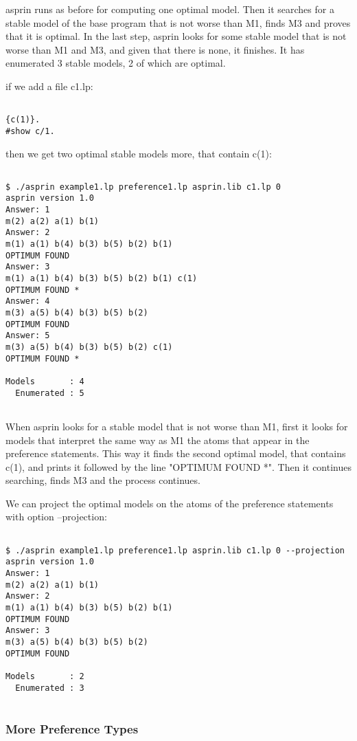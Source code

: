 asprin runs as before for computing one optimal model. Then it searches for a stable model of the base program that is not worse than M1, finds M3 and proves that it is optimal. In the last step, asprin looks for some stable model that is not worse than M1 and M3,  and given that there is none, it finishes. It has enumerated 3 stable models, 2 of which are optimal. 

 if we add a file c1.lp: 
\begin{verbatim}

{c(1)}.
#show c/1.
\end{verbatim}

 then we get two optimal stable models more, that contain c(1): 
\begin{verbatim}

$ ./asprin example1.lp preference1.lp asprin.lib c1.lp 0
asprin version 1.0
Answer: 1
m(2) a(2) a(1) b(1)
Answer: 2
m(1) a(1) b(4) b(3) b(5) b(2) b(1)
OPTIMUM FOUND
Answer: 3
m(1) a(1) b(4) b(3) b(5) b(2) b(1) c(1)
OPTIMUM FOUND *
Answer: 4
m(3) a(5) b(4) b(3) b(5) b(2)
OPTIMUM FOUND
Answer: 5
m(3) a(5) b(4) b(3) b(5) b(2) c(1)
OPTIMUM FOUND *

Models       : 4
  Enumerated : 5
  
\end{verbatim}

 When asprin looks for a stable model that is not worse than M1,  first it looks for models that interpret the same way as M1 the atoms that appear in the preference statements. This way it finds the second optimal model, that contains c(1), and prints it followed by the line "OPTIMUM FOUND *".  Then it continues searching, finds M3 and the process continues. 

 We can project the optimal models on the atoms of the preference statements with option --projection: 
\begin{verbatim}

$ ./asprin example1.lp preference1.lp asprin.lib c1.lp 0 --projection
asprin version 1.0
Answer: 1
m(2) a(2) a(1) b(1)
Answer: 2
m(1) a(1) b(4) b(3) b(5) b(2) b(1)
OPTIMUM FOUND
Answer: 3
m(3) a(5) b(4) b(3) b(5) b(2)
OPTIMUM FOUND

Models       : 2
  Enumerated : 3
  
\end{verbatim}

\subsubsection{More Preference Types}

